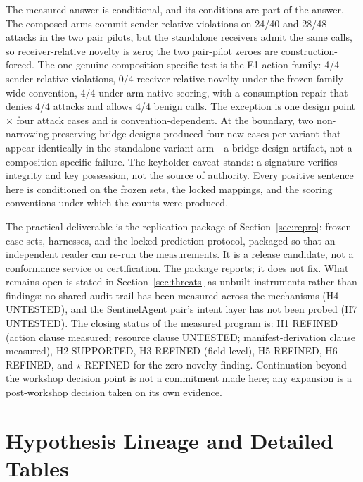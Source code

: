 \documentclass[sigconf,anonymous,nonacm]{acmart}
\newcommand{\status}[1]{\textsc{#1}}
\newcommand{\seamstar}{\ensuremath{\star}}
\begin{document}
The measured answer is conditional, and its conditions are part of the answer. The composed arms commit sender-relative violations on 24/40 and 28/48 attacks in the two pair pilots, but the standalone receivers admit the same calls, so receiver-relative novelty is zero; the two pair-pilot zeroes are construction-forced. The one genuine composition-specific test is the E1 action family: 4/4 sender-relative violations, 0/4 receiver-relative novelty under the frozen family-wide convention, 4/4 under arm-native scoring, with a consumption repair that denies 4/4 attacks and allows 4/4 benign calls. The exception is one design point $\times$ four attack cases and is convention-dependent. At the boundary, two non-narrowing-preserving bridge designs produced four new cases per variant that appear identically in the standalone variant arm---a bridge-design artifact, not a composition-specific failure. The keyholder caveat stands: a signature verifies integrity and key possession, not the source of authority. Every positive sentence here is conditioned on the frozen sets, the locked mappings, and the scoring conventions under which the counts were produced.

The practical deliverable is the replication package of Section~\ref{sec:repro}: frozen case sets, harnesses, and the locked-prediction protocol, packaged so that an independent reader can re-run the measurements. It is a release candidate, not a conformance service or certification. The package reports; it does not fix. What remains open is stated in Section~\ref{sec:threats} as unbuilt instruments rather than findings: no shared audit trail has been measured across the mechanisms (H4 \status{UNTESTED}), and the SentinelAgent pair's intent layer has not been probed (H7 \status{UNTESTED}). The closing status of the measured program is: H1 \status{REFINED} (action clause measured; resource clause \status{UNTESTED}; manifest-derivation clause measured), H2 \status{SUPPORTED}, H3 \status{REFINED} (field-level), H5 \status{REFINED}, H6 \status{REFINED}, and \seamstar{} \status{REFINED} for the zero-novelty finding. Continuation beyond the workshop decision point is not a commitment made here; any expansion is a post-workshop decision taken on its own evidence.

\setlength{\bibsep}{0pt}
\enlargethispage{5\baselineskip}



\appendix
\onecolumn
\renewcommand{\thetable}{A\arabic{table}}
\setcounter{table}{0}
\section{Hypothesis Lineage and Detailed Tables}
\end{document}
